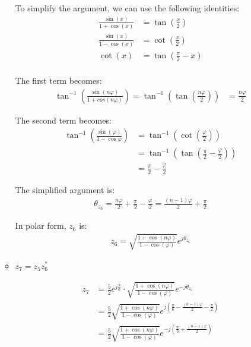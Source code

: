 \documentclass{article}
\begin{document}
\begin{enumerate}
\begin{itemize}
        To simplify the argument, we can use the following identities:
        \begin{align*}
            \frac{\sin(x)}{1+\cos(x)} &= \tan\left(\frac{x}{2}\right) \\
            \frac{\sin(x)}{1-\cos(x)} &= \cot\left(\frac{x}{2}\right) \\
            \cot(x) &= \tan\left(\frac{\pi}{2} - x\right) \\
        \end{align*}

        The first term becomes:
        \begin{align*}
            \tan^{-1}\left(\frac{\sin(n\varphi)}{1+cos(n\varphi)}\right) = \tan^{-1}\left(\tan\left(\frac{n\varphi}{2}\right)\right) &= \frac{n\varphi}{2}
        \end{align*}

        The second term becomes:
        \begin{align*}
            \tan^{-1}\left(\frac{\sin(\varphi)}{1-\cos{\varphi}}\right) &= \tan^{-1}\left(\cot\left(\frac{\varphi}{2}\right)\right) \\
            &= \tan^{-1}\left(\tan\left(\frac{\pi}{2} - \frac{\varphi}{2}\right)\right) \\
            &= \frac{\pi}{2} - \frac{\varphi}{2}
        \end{align*}

        The simplified argument is:
        \begin{align*}
            \theta_{z_6} = \frac{n\varphi}{2} + \frac{\pi}{2} - \frac{\varphi}{2} = \frac{(n-1)\varphi}{2} + \frac{\pi}{2}
        \end{align*}

        In polar form, $z_6$ is:
        \begin{align*}
            z_6 = \sqrt{\frac{1+\cos(n\varphi)}{1-\cos(\varphi)}}e^{j\theta_{z_6}}
        \end{align*}

        \item $z_7 = z_5z^*_6$

        \begin{align*}
            z_7 &= \frac{5}{2}e^{j\frac{\pi}{6}} \cdot \sqrt{\frac{1+\cos(n\varphi)}{1-\cos(\varphi)}}e^{-j\theta_{z_6}} \\
            &= \frac{5}{2}\sqrt{\frac{1+\cos(n\varphi)}{1-\cos(\varphi)}}e^{j\left(\frac{\pi}{6} - \frac{(n-1)\varphi}{2} - \frac{\pi}{2}\right)} \\
            &= \frac{5}{2}\sqrt{\frac{1+\cos(n\varphi)}{1-\cos(\varphi)}}e^{-j\left(\frac{\pi}{3} + \frac{(n-1)\varphi}{2}\right)} \\
        \end{align*}
    \end{itemize}


\end{enumerate}
\end{document}
